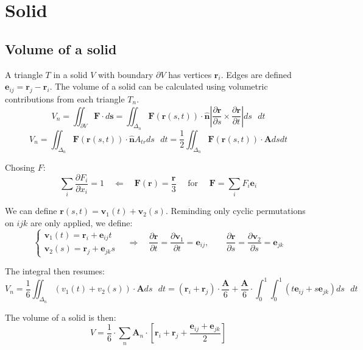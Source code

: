 \section{Solid}
\subsection{Volume of a solid}
A triangle $T$ in a solid $V$ with boundary $\partial V$ has vertices $\mathbf r_i$. Edges are defined $\mathbf e_{ij} = \mathbf r_j - \mathbf r_i$. The volume of a solid can be calculated using volumetric contributions from each triangle $T_n$.
$$
V_n = \iint_{\partial V}\mathbf F\cdot d\mathbf{s} = 
\iint_{\Delta_n}\mathbf F(\mathbf r(s, t))\cdot\mathbf{\hat n}\left|\frac{\partial\mathbf r}{\partial s}\times\frac{\partial\mathbf r}{\partial t} \right| ds\mbox{ }dt
$$
$$
V_n = \iint_{\Delta_n}\mathbf F(\mathbf r(s, t))\cdot\mathbf{\hat n}A_{tr}ds\mbox{ }dt =
\frac{1}{2}\iint_{\Delta_n}\mathbf F(\mathbf r(s, t))\cdot\mathbf A dsdt
$$

Chosing $F$:
$$
\sum_i \frac{\partial F_i}{\partial x_i} = 1 \quad\Longleftarrow\quad
\mathbf F(\mathbf r) = \frac{\mathbf r}{3} \quad\mbox{ for }\quad
\mathbf F = \sum_i F_i \mathbf e_i
$$

We can define $\mathbf r(s, t) = \mathbf v_1(t) + \mathbf v_2 (s)$. Reminding only cyclic permutations on $ijk$ are only applied, we define:
\[
  \begin{cases}
   \mathbf v_1(t) = \mathbf r_i + \mathbf e_{ij}t  \\
   \mathbf v_2(s) = \mathbf r_j + \mathbf e_{jk}s
  \end{cases}
  \quad\Longrightarrow\quad
  \frac{\partial\mathbf r}{\partial t} = \frac{\partial\mathbf v_1}{\partial t} = \mathbf e_{ij}, \quad\quad
  \frac{\partial\mathbf r}{\partial s} = \frac{\partial\mathbf v_2}{\partial s} = \mathbf e_{jk}
\]

The integral then resumes:
$$
V_n = \frac{1}{6}\iint_{\Delta_n}\left( v_1(t) + v_2(s)\right)\cdot\mathbf A ds\mbox{ }dt = 
\left(\mathbf r_i + \mathbf r_j\right)\cdot\frac{\mathbf A}{6} + \frac{\mathbf A}{6}\cdot\int_0^1\int_0^1\left( t \mathbf e_{ij} + s \mathbf e_{jk} \right) ds\mbox{ }dt
$$

The volume of a solid is then:
$$
V = \frac{1}{6}\cdot\sum_n\mathbf A_n\cdot\left[ \mathbf r_i + \mathbf r_j + \frac{\mathbf e_{ij} + \mathbf e_{jk}}{2}  \right] 
$$
\newpage






